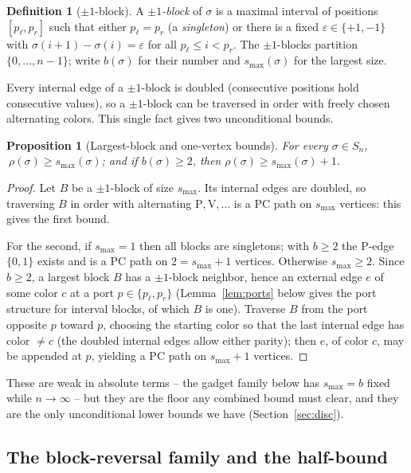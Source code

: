 \documentclass[11pt]{article}
\newtheorem{proposition}[theorem]{Proposition}
\theoremstyle{definition}
\newtheorem{definition}[theorem]{Definition}
\newcommand{\smax}{s_{\max}}
\begin{document}
\begin{definition}[$\pm1$-block]\label{def:pmblock}
A \emph{$\pm1$-block} of $\sigma$ is a maximal interval of positions
$[p_\ell,p_r]$ such that either $p_\ell=p_r$ (a \emph{singleton}) or there is a fixed
$\varepsilon\in\{+1,-1\}$ with $\sigma(i+1)-\sigma(i)=\varepsilon$ for all
$p_\ell\le i<p_r$. The $\pm1$-blocks partition $\{0,\dots,n-1\}$; write $b(\sigma)$
for their number and $\smax(\sigma)$ for the largest size.
\end{definition}

Every internal edge of a $\pm1$-block is doubled (consecutive positions hold
consecutive values), so a $\pm1$-block can be traversed in order with freely chosen
alternating colors. This single fact gives two unconditional bounds.

\begin{proposition}[Largest-block and one-vertex bounds]\label{prop:survive}
For every $\sigma\in S_n$, $\ \rho(\sigma)\ge\smax(\sigma)$; and if $b(\sigma)\ge2$,
then $\rho(\sigma)\ge\smax(\sigma)+1$.
\end{proposition}

\begin{proof}
Let $B$ be a $\pm1$-block of size $\smax$. Its internal edges are doubled, so
traversing $B$ in order with alternating $\mathrm P,\mathrm V,\dots$ is a PC path on
$\smax$ vertices: this gives the first bound.

For the second, if $\smax=1$ then all blocks are singletons; with $b\ge2$ the P-edge
$\{0,1\}$ exists and is a PC path on $2=\smax+1$ vertices. Otherwise $\smax\ge2$. Since
$b\ge2$, a largest block $B$ has a $\pm1$-block neighbor, hence an external edge $e$ of
some color $c$ at a port $p\in\{p_\ell,p_r\}$ (Lemma~\ref{lem:ports} below gives the
port structure for interval blocks, of which $B$ is one). Traverse $B$ from the port
opposite $p$ toward $p$, choosing the starting color so that the last internal edge has
color $\ne c$ (the doubled internal edges allow either parity); then $e$, of color $c$,
may be appended at $p$, yielding a PC path on $\smax+1$ vertices.
\end{proof}

These are weak in absolute terms -- the gadget family below has $\smax=b$ fixed while
$n\to\infty$ -- but they are the floor any combined bound must clear, and they are the
only unconditional lower bounds we have (Section~\ref{sec:disc}).

\subsection{The block-reversal family and the half-bound}
\end{document}
